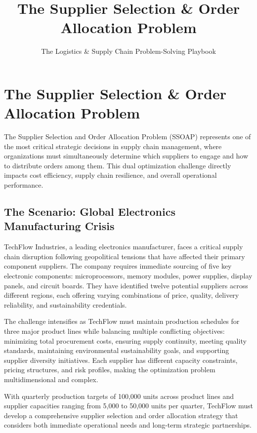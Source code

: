 \documentclass{article}
\title{The Supplier Selection \& Order Allocation Problem}
\author{The Logistics \& Supply Chain Problem-Solving Playbook}
\date{}
\begin{document}
\maketitle

\section{The Supplier Selection \& Order Allocation Problem}

The Supplier Selection and Order Allocation Problem (SSOAP) represents one of the most critical strategic decisions in supply chain management, where organizations must simultaneously determine which suppliers to engage and how to distribute orders among them. This dual optimization challenge directly impacts cost efficiency, supply chain resilience, and overall operational performance.

\subsection{The Scenario: Global Electronics Manufacturing Crisis}

TechFlow Industries, a leading electronics manufacturer, faces a critical supply chain disruption following geopolitical tensions that have affected their primary component suppliers. The company requires immediate sourcing of five key electronic components: microprocessors, memory modules, power supplies, display panels, and circuit boards. They have identified twelve potential suppliers across different regions, each offering varying combinations of price, quality, delivery reliability, and sustainability credentials.

The challenge intensifies as TechFlow must maintain production schedules for three major product lines while balancing multiple conflicting objectives: minimizing total procurement costs, ensuring supply continuity, meeting quality standards, maintaining environmental sustainability goals, and supporting supplier diversity initiatives. Each supplier has different capacity constraints, pricing structures, and risk profiles, making the optimization problem multidimensional and complex.

With quarterly production targets of 100,000 units across product lines and supplier capacities ranging from 5,000 to 50,000 units per quarter, TechFlow must develop a comprehensive supplier selection and order allocation strategy that considers both immediate operational needs and long-term strategic partnerships.
\end{document}
